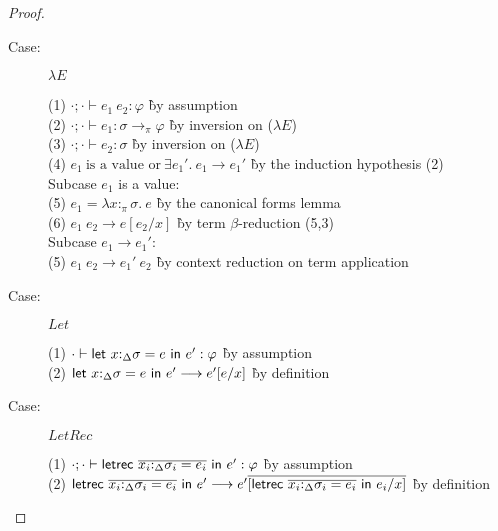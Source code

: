 \begin{proof}
\begin{description}
\item[Case:] $\lambda E$
\begin{tabbing}
(1) $\cdot; \cdot \vdash e_1~e_2 : \varphi$ \` by assumption \\
(2) $\cdot; \cdot \vdash e_1 : \sigma \to_\pi \varphi$ \` by inversion on ($\lambda E$) \\
(3) $\cdot; \cdot \vdash e_2 : \sigma$ \` by inversion on ($\lambda E$) \\
(4) $e_1~\textrm{is a value or}~\exists e_1'.~e_1\longrightarrow e_1'$ \` by the induction hypothesis (2) \\
\textrm{Subcase $e_1$ is a value:}\\
(5) $e_1 = \lambda x{:}_\pi\sigma.~e$ \` by the canonical forms lemma \\
(6) $e_1~e_2 \longrightarrow e[e_2/x]$ \` by term $\beta$-reduction (5,3) \\
\textrm{Subcase $e_1\longrightarrow e_1'$:}\\
(5) $e_1~e_2\longrightarrow e_1'~e_2$ \` by context reduction on term application \\
\end{tabbing}

\item[Case:] $Let$
\begin{tabbing}
(1) $\cdot \vdash \mathsf{let}~x{:}_\Delta\sigma = e~\mathsf{in}~e' : \varphi$ \` by assumption \\
(2) $\mathsf{let}~x{:}_\Delta\sigma = e~\mathsf{in}~e'\longrightarrow e'[e/x]$ \` by definition\\
\end{tabbing}

\item[Case:] $LetRec$
\begin{tabbing}
(1) $\cdot; \cdot \vdash \mathsf{letrec}~\overline{x_i{:}_\Delta\sigma_i = e_i}~\mathsf{in}~e' : \varphi$ \` by assumption \\
(2) $\mathsf{letrec}~\overline{x_i{:}_\Delta\sigma_i = e_i}~\mathsf{in}~e' \longrightarrow
    e'\overline{[\mathsf{letrec}~\overline{x_i{:}_\Delta\sigma_i = e_i}~\mathsf{in}~e_i/x]}$ \` by definition\\
\end{tabbing}


\end{description}
\end{proof}

